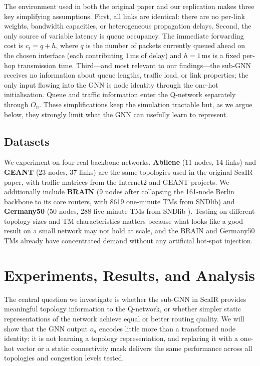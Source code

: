 \documentclass[10pt,twocolumn,letterpaper]{article}
\begin{document}
The environment used in both the original paper and our replication
makes three key simplifying assumptions. First, all links are
identical: there are no per-link weights, bandwidth capacities, or
heterogeneous propagation delays. Second, the only source of variable
latency is queue occupancy. The immediate forwarding cost is $c_t = q
+ h$, where $q$ is the number of packets currently queued ahead on the
chosen interface (each contributing $1$\,ms of delay) and $h = 1$\,ms
is a fixed per-hop transmission time. Third---and most relevant to our
findings---the sub-GNN receives no information about queue lengths,
traffic load, or link properties; the only input flowing into the GNN
is node identity through the one-hot initialisation. Queue and traffic
information enter the Q-network separately through $O_n$. These
simplifications keep the simulation tractable but, as we argue below,
they strongly limit what the GNN can usefully learn to represent.

\subsection{Datasets}

We experiment on four real backbone networks. \textbf{Abilene} (11
nodes, 14 links) and \textbf{GEANT} (23 nodes, 37 links) are the same
topologies used in the original ScaIR paper, with traffic matrices from
the Internet2 and GEANT projects. We additionally include \textbf{BRAIN}
(9 nodes after collapsing the 161-node Berlin backbone to its core
routers, with 8619 one-minute TMs from SNDlib) and \textbf{Germany50}
(50 nodes, 288 five-minute TMs from SNDlib \cite{sndlib}). Testing on
different topology sizes and TM characteristics matters because what
looks like a good result on a small network may not hold at scale, and
the BRAIN and Germany50 TMs already have concentrated demand without any
artificial hot-spot injection.

\section{Experiments, Results, and Analysis}
\label{sec:experiments}

The central question we investigate is whether the sub-GNN in ScaIR
provides meaningful topology information to the Q-network, or whether
simpler static representations of the network achieve equal or better
routing quality. We will show that the GNN output $o_n$ encodes little
more than a transformed node identity: it is not learning a topology
representation, and replacing it with a one-hot vector or a static
connectivity mask delivers the same performance across all topologies
and congestion levels tested.
\end{document}
